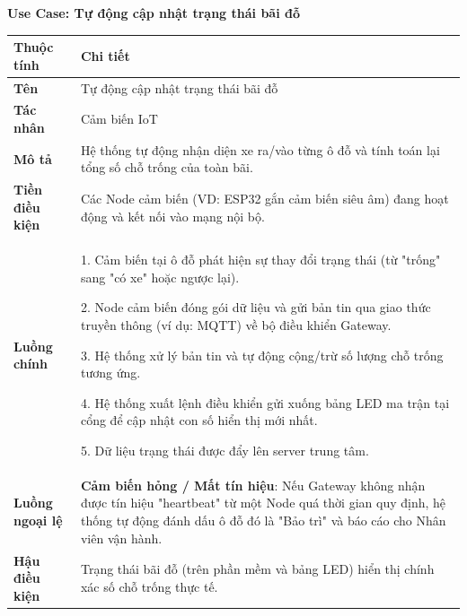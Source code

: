 \noindent \textbf{Use Case: Tự động cập nhật trạng thái bãi đỗ} \\
\renewcommand{\arraystretch}{1.6}
\begin{xltabular}{\textwidth}{|l|X|}
\hline
\textbf{Thuộc tính} & \textbf{Chi tiết} \\
\hline
\textbf{Tên} & Tự động cập nhật trạng thái bãi đỗ \\
\hline
\textbf{Tác nhân} & Cảm biến IoT \\
\hline
\textbf{Mô tả} & Hệ thống tự động nhận diện xe ra/vào từng ô đỗ và tính toán lại tổng số chỗ trống của toàn bãi. \\
\hline
\textbf{Tiền điều kiện} & Các Node cảm biến (VD: ESP32 gắn cảm biến siêu âm) đang hoạt động và kết nối vào mạng nội bộ. \\
\hline
\textbf{Luồng chính} & 
1. Cảm biến tại ô đỗ phát hiện sự thay đổi trạng thái (từ "trống" sang "có xe" hoặc ngược lại).

2. Node cảm biến đóng gói dữ liệu và gửi bản tin qua giao thức truyền thông (ví dụ: MQTT) về bộ điều khiển Gateway.

3. Hệ thống xử lý bản tin và tự động cộng/trừ số lượng chỗ trống tương ứng.

4. Hệ thống xuất lệnh điều khiển gửi xuống bảng LED ma trận tại cổng để cập nhật con số hiển thị mới nhất.

5. Dữ liệu trạng thái được đẩy lên server trung tâm.
\\
\hline

\textbf{Luồng ngoại lệ} & 
\textbf{Cảm biến hỏng / Mất tín hiệu}: Nếu Gateway không nhận được tín hiệu "heartbeat" từ một Node quá thời gian quy định, hệ thống tự động đánh dấu ô đỗ đó là "Bảo trì" và báo cáo cho Nhân viên vận hành.
\\
\hline

\textbf{Hậu điều kiện} & Trạng thái bãi đỗ (trên phần mềm và bảng LED) hiển thị chính xác số chỗ trống thực tế.\\
\hline
\end{xltabular}

